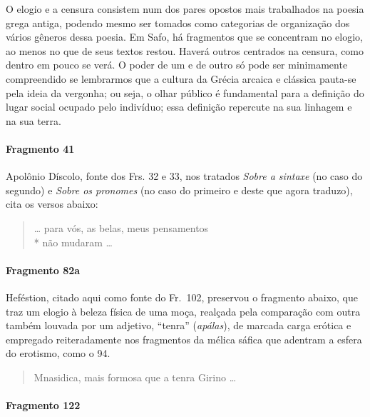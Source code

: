 O elogio e a censura consistem num dos pares opostos mais trabalhados na poesia
grega antiga, podendo mesmo ser tomados como categorias de organização dos
vários gêneros dessa poesia. Em Safo, há fragmentos que se concentram no
elogio, ao menos no que de seus textos restou. Haverá outros centrados na
censura, como dentro em pouco se verá. O poder de um e de outro só pode ser
minimamente compreendido se lembrarmos que a cultura da Grécia arcaica e
clássica pauta-se pela ideia da vergonha; ou seja, o olhar público é
fundamental para a definição do lugar social ocupado pelo indivíduo; essa
definição repercute na sua linhagem e na sua terra. 

\paragraph{Fragmento 41}

{\small Apolônio Díscolo, fonte dos Frs. 32 e 33, nos tratados \textit{Sobre a sintaxe}
(no caso do segundo) e \textit{Sobre os pronomes }(no caso do primeiro e deste
que agora traduzo), cita os versos abaixo:}

\begin{verse}
\ldots{} para vós, as belas, meus pensamentos\\*
não mudaram \ldots{}
\end{verse}

\paragraph{Fragmento 82a}

{\small Heféstion, citado aqui como fonte do Fr.~102, preservou o fragmento abaixo, que traz
um elogio à beleza física de uma moça, realçada pela comparação com outra
também louvada por um adjetivo, ``tenra” (\textit{apálas}), de marcada
carga erótica e empregado reiteradamente nos fragmentos da mélica sáfica que
adentram a esfera do erotismo, como o 94.}

\begin{verse}
Mnasidica, mais formosa que a tenra Girino \ldots{}
\end{verse}


\paragraph{Fragmento 122}


